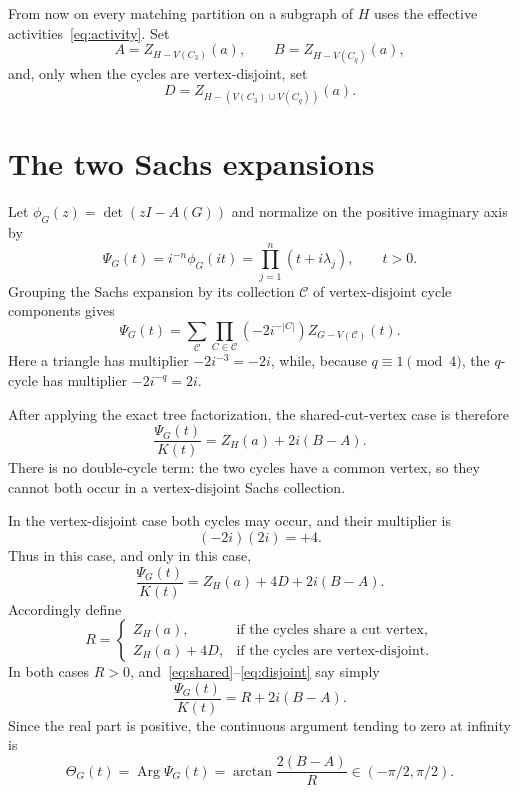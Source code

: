 \documentclass[11pt]{article}
\theoremstyle{remark}
\newcommand{\Arg}{\operatorname{Arg}}
\begin{document}
From now on every matching partition on a subgraph of $H$ uses the effective
activities~\eqref{eq:activity}.  Set
\begin{equation}\label{eq:ABD}
 A=Z_{H-V(C_3)}(a),
 \qquad
 B=Z_{H-V(C_q)}(a),
\end{equation}
and, only when the cycles are vertex-disjoint, set
\begin{equation}\label{eq:D}
 D=Z_{H-(V(C_3)\cup V(C_q))}(a).
\end{equation}

\section{The two Sachs expansions}

Let $\phi_G(z)=\det(zI-A(G))$ and normalize on the positive imaginary axis by
\begin{equation}\label{eq:Psi}
 \Psi_G(t)=i^{-n}\phi_G(it)=\prod_{j=1}^n(t+i\lambda_j),
 \qquad t>0.
\end{equation}
Grouping the Sachs expansion by its collection $\mathcal C$ of
vertex-disjoint cycle components gives
\begin{equation}\label{eq:Sachs}
 \Psi_G(t)=\sum_{\mathcal C}
  \prod_{C\in\mathcal C}(-2i^{-|C|})
  Z_{G-V(\mathcal C)}(t).
\end{equation}
Here a triangle has multiplier $-2i^{-3}=-2i$, while, because
$q\equiv1\pmod4$, the $q$-cycle has multiplier
$-2i^{-q}=2i$.

After applying the exact tree factorization, the shared-cut-vertex case is
therefore
\begin{equation}\label{eq:shared}
 \boxed{\ \frac{\Psi_G(t)}{K(t)}=Z_H(a)+2i(B-A).\ }
\end{equation}
There is no double-cycle term: the two cycles have a common vertex, so they
cannot both occur in a vertex-disjoint Sachs collection.

In the vertex-disjoint case both cycles may occur, and their multiplier is
\[
 (-2i)(2i)=+4.
\]
Thus in this case, and only in this case,
\begin{equation}\label{eq:disjoint}
 \boxed{\ \frac{\Psi_G(t)}{K(t)}=Z_H(a)+4D+2i(B-A).\ }
\end{equation}
Accordingly define
\begin{equation}\label{eq:R}
 R=\begin{cases}
 Z_H(a),&\text{if the cycles share a cut vertex},\\
 Z_H(a)+4D,&\text{if the cycles are vertex-disjoint}.
 \end{cases}
\end{equation}
In both cases $R>0$, and~\eqref{eq:shared}--\eqref{eq:disjoint} say simply
\begin{equation}\label{eq:normalized-core}
 \frac{\Psi_G(t)}{K(t)}=R+2i(B-A).
\end{equation}
Since the real part is positive, the continuous argument tending to zero at
infinity is
\begin{equation}\label{eq:Theta}
 \Theta_G(t)=\Arg\Psi_G(t)
 =\arctan\frac{2(B-A)}{R}\in(-\pi/2,\pi/2).
\end{equation}
\end{document}

